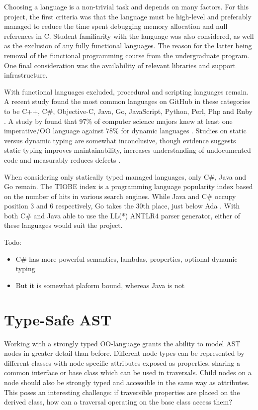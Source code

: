 \documentclass[twoside,openright]{uva-bachelor-thesis}
\begin{document}
		Choosing a language is a non-trivial task and depends on many factors. For this project, the first criteria was that the language must be high-level and preferably managed to reduce the time spent debugging memory allocation and null references in C. Student familiarity with the language was also considered, as well as the exclusion of any fully functional languages. The reason for the latter being removal of the functional programming course from the undergraduate program. One final consideration was the availability of relevant libraries and support infrastructure. 
		
		With functional languages excluded, procedural and scripting languages remain. A recent study found the most common languages on GitHub in these categories to be C++, C\#, Objective-C, Java, Go, JavaScript, Python, Perl, Php and Ruby \cite{Ray2014}. A study by \citeauthor{Meyerovich2013} found that 97\% of computer science majors knew at least one imperative/OO language against 78\% for dynamic languages \cite{Meyerovich2013}. Studies on static versus dynamic typing are somewhat inconclusive, though evidence suggests static typing improves maintainability, increases understanding of undocumented code and measurably reduces defects \cite{Hanenberg2014,Ray2014}.
		
		When considering only statically typed managed languages, only C\#, Java and Go remain. The TIOBE index is a  programming language popularity index based on the number of hits in various search engines. While Java and C\# occupy position 3 and 6 respectively, Go takes the 30th place, just below Ada \cite{Nanz2014}. With both C\# and Java able to use the LL(*) ANTLR4 parser generator, either of these languages would suit the project.
		
		Todo:
		\begin{itemize}
			\item C\# has more powerful semantics, lambdas, properties, optional dynamic typing
			\item But it is somewhat plaform bound, whereas Java is not
		\end{itemize}
						
	\section{Type-Safe AST}
	\label{sec:type-safe-ast}
		Working with a strongly typed OO-language grants the ability to model AST nodes in greater detail than before. Different node types can be represented by different classes with node specific attributes exposed as properties, sharing a common interface or base class which can be used in traversals. Child nodes on a node should also be strongly typed and accessible in the same way as attributes. This poses an interesting challenge: if traversible properties are placed on the derived class, how can a traversal operating on the base class access them?
		
\end{document}
